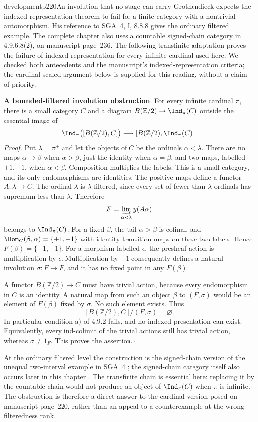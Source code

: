 \begin{dcomment}{development}{p220}{An involution that no stage can carry}
Grothendieck expects the indexed-representation theorem to fail for a finite category with a nontrivial automorphism. His reference to SGA~4, I, 8.8.8 gives the ordinary filtered example. The complete chapter also uses a countable signed-chain category in 4.9.6.8(2), on manuscript page~236. The following transfinite adaptation proves the failure of indexed representation for every infinite cardinal used here. We checked both antecedents and the manuscript's indexed-representation criteria; the cardinal-scaled argument below is supplied for this reading, without a claim of priority.

\textbf{A bounded-filtered involution obstruction}\ours.
For every infinite cardinal $\pi$, there is a small category $C$ and a diagram $B(\mathbb Z/2)\to\Ind_\pi(C)$ outside the essential image of
\[
 \Ind_\pi\bigl([B(\mathbb Z/2),C]\bigr)
 \longrightarrow[B(\mathbb Z/2),\Ind_\pi(C)].
\]
\textit{Proof.} Put $\lambda=\pi^+$ and let the objects of $C$ be the ordinals $\alpha<\lambda$. There are no maps $\alpha\to\beta$ when $\alpha>\beta$, just the identity when $\alpha=\beta$, and two maps, labelled $+1,-1$, when $\alpha<\beta$. Composition multiplies the labels. This is a small category, and its only endomorphisms are identities. The positive maps define a functor $A:\lambda\to C$. The ordinal $\lambda$ is $\lambda$-filtered, since every set of fewer than $\lambda$ ordinals has supremum less than $\lambda$. Therefore
\[
 F=\varinjlim_{\alpha<\lambda}y(A\alpha)
\]
belongs to $\Ind_\pi(C)$. For a fixed $\beta$, the tail $\alpha>\beta$ is cofinal, and $\Hom_C(\beta,\alpha)=\{+1,-1\}$ with identity transition maps on these two labels. Hence $F(\beta)=\{+1,-1\}$. For a morphism labelled $\epsilon$, the presheaf action is multiplication by $\epsilon$. Multiplication by $-1$ consequently defines a natural involution $\sigma:F\to F$, and it has no fixed point in any $F(\beta)$.

A functor $B(\mathbb Z/2)\to C$ must have trivial action, because every endomorphism in $C$ is an identity. A natural map from such an object $\beta$ to $(F,\sigma)$ would be an element of $F(\beta)$ fixed by $\sigma$. No such element exists. Thus
\[
 [B(\mathbb Z/2),C]/(F,\sigma)=\varnothing.
\]
In particular condition a) of 4.9.2 fails, and no indexed presentation can exist. Equivalently, every ind-colimit of the trivial actions still has trivial action, whereas $\sigma\neq1_F$. This proves the assertion.\hfill$\square$

At the ordinary filtered level the construction is the signed-chain version of the unequal two-interval example in SGA~4 \citep[I, Exercise~8.8.8]{SGA4I1972}; the signed-chain category itself also occurs later in this chapter \citep[4.9.6.8(2)]{Grothendieck1990XVIII}. The transfinite chain is essential here: replacing it by the countable chain would not produce an object of $\Ind_\pi(C)$ when $\pi$ is infinite. The obstruction is therefore a direct answer to the cardinal version posed on manuscript page~220, rather than an appeal to a counterexample at the wrong filteredness rank.
\end{dcomment}

